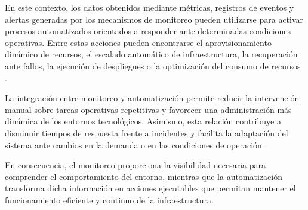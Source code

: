 En este contexto, los datos obtenidos mediante métricas, registros de eventos y alertas generadas por los mecanismos de monitoreo pueden utilizarse para activar procesos automatizados orientados a responder ante determinadas condiciones operativas. Entre estas acciones pueden encontrarse el aprovisionamiento dinámico de recursos, el escalado automático de infraestructura, la recuperación ante fallos, la ejecución de despliegues o la optimización del consumo de recursos \parencite{Ward2014, RedHat2026}.

La integración entre monitoreo y automatización permite reducir la intervención manual sobre tareas operativas repetitivas y favorecer una administración más dinámica de los entornos tecnológicos. Asimismo, esta relación contribuye a disminuir tiempos de respuesta frente a incidentes y facilita la adaptación del sistema ante cambios en la demanda o en las condiciones de operación \parencite{GoogleCloud2026}.

En consecuencia, el monitoreo proporciona la visibilidad necesaria para comprender el comportamiento del entorno, mientras que la automatización transforma dicha información en acciones ejecutables que permitan mantener el funcionamiento eficiente y continuo de la infraestructura.
